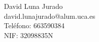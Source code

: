 David Luna Jurado \\ %
david.lunajurado@alum.uca.es\\ %
Teléfono: 663590384 \\ %
NIF: 32098835N \\ %
